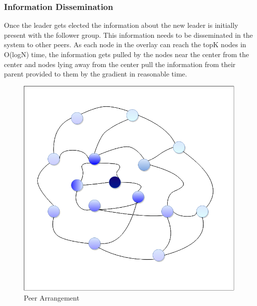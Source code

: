 \documentclass[12pt,a4paper,twoside,openright]{book}
\begin{document}
\subsubsection{Information Dissemination}

Once the leader gets elected the information about the new leader is initially present with the follower group. This information needs to be disseminated in the system to other peers. As each node in the overlay can reach the topK nodes in O(logN) time, the information gets pulled by the nodes near the center from the center and nodes lying away from the center pull the information from their parent provided to them by the gradient in reasonable time.

\begin{figure}[h]
	\includegraphics[scale=0.5]{p2p}
	\centering
	\caption{Peer Arrangement}
	\label{fig:p-arrange}
\end{figure}
\end{document}

